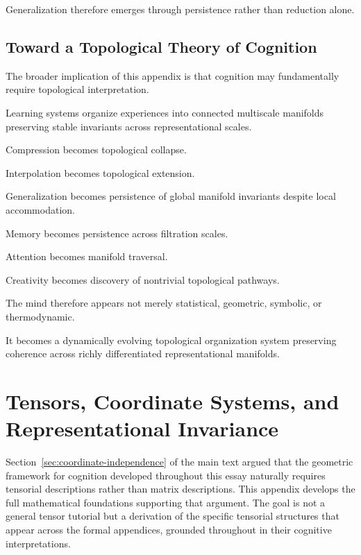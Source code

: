 \documentclass[12pt,a4paper]{article}
\begin{document}
Generalization therefore emerges through persistence rather than reduction alone.

\subsection{Toward a Topological Theory of Cognition}

The broader implication of this appendix is that cognition may fundamentally require topological interpretation.

Learning systems organize experiences into connected multiscale manifolds preserving stable invariants across representational scales.

Compression becomes topological collapse.

Interpolation becomes topological extension.

Generalization becomes persistence of global manifold invariants despite local accommodation.

Memory becomes persistence across filtration scales.

Attention becomes manifold traversal.

Creativity becomes discovery of nontrivial topological pathways.

The mind therefore appears not merely statistical, geometric, symbolic, or thermodynamic.

It becomes a dynamically evolving topological organization system preserving coherence across richly differentiated representational manifolds.


\section{Tensors, Coordinate Systems, and Representational Invariance}
\label{app:tensors}

Section~\ref{sec:coordinate-independence} of the main text argued that the geometric framework for cognition developed throughout this essay naturally requires tensorial descriptions rather than matrix descriptions. This appendix develops the full mathematical foundations supporting that argument. The goal is not a general tensor tutorial but a derivation of the specific tensorial structures that appear across the formal appendices, grounded throughout in their cognitive interpretations.
\end{document}
